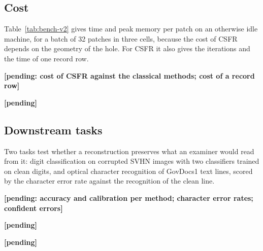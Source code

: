 \documentclass[final,3p]{elsarticle}
\newcommand{\resultpending}[1]{\textbf{[pending: #1]}}
\begin{document}
\subsection{Cost}
\label{sec:results:cost}

Table~\ref{tab:bench-v2} gives time and peak memory per patch on an otherwise idle machine, for a batch of 32 patches in three cells, because the cost of CSFR depends on the geometry of the hole. For CSFR it also gives the iterations and the time of one record row.

\resultpending{cost of CSFR against the classical methods; cost of a record row}

\begin{table}[!t]
\centering
\caption{Time and peak memory per patch, and for CSFR the median iterations and the time of one record row, on an otherwise idle machine.}
\label{tab:bench-v2}
\footnotesize
\textbf{[pending]}
\end{table}

\subsection{Downstream tasks}
\label{sec:results:downstream}

Two tasks test whether a reconstruction preserves what an examiner would read from it: digit classification on corrupted SVHN images with two classifiers trained on clean digits, and optical character recognition of GovDocs1 text lines, scored by the character error rate against the recognition of the clean line.

\resultpending{accuracy and calibration per method; character error rates; confident errors}

\begin{table}[!t]
\centering
\caption{Digit classification on corrupted SVHN: accuracy and expected calibration error of two classifiers on the reconstructions of each method.}
\label{tab:downstream-v2}
\footnotesize
\textbf{[pending]}
\end{table}

\begin{table}[!t]
\centering
\caption{Optical character recognition of GovDocs1 text lines: character error rate on the reconstructions of each method, against the recognition of the clean line.}
\label{tab:ocr}
\footnotesize
\textbf{[pending]}
\end{table}
\end{document}
